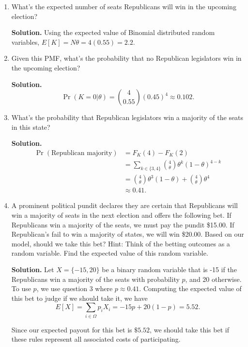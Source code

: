 \documentclass[12pt]{article}
\begin{document}
\begin{enumerate}
    \item What’s the expected number of seats Republicans will win in the upcoming election?

    \textbf{Solution.} Using the expected value of Binomial distributed random variables, $E[K]=N\theta = 4(0.55)=2.2$.

    \item Given this PMF, what’s the probability that no Republican legislators win in the upcoming election?

    \textbf{Solution.}
    \[ \Pr(K=0 | \theta) = \binom{4}{0.55}    (0.45)^{4} \approx 0.102. \]
    
    \item What’s the probability that Republican legislators win a majority of the seats in this state?

    \textbf{Solution.} 
    \begin{align*}
         \Pr(\text{Republican majority}) &= F_K(4)-F_K(2) 
         \\ &= \sum_{k\in\{3,4\}}\binom{4}{\theta}\theta^k    (1-\theta)^{4-k} 
         \\ &= \binom{4}{\theta}\theta^3    (1-\theta) + \binom{4}{\theta}\theta^4 
         \\ &\approx 0.41.
    \end{align*}

    \item  A prominent political pundit declares they are certain that Republicans will win a majority of seats in the next election and offers the following bet. If Republicans win a majority of the seats, we must pay the pundit \$15.00. If Republican’s fail to win a majority of states, we will win \$20.00. Based on our model, should we take this bet? Hint: Think of the betting outcomes as a random variable. Find the expected value of this random variable.

    \textbf{Solution.} Let $X=\{-15,20\}$ be a binary random variable that is -15 if the Republicans win a majority of the seats with probability $p$, and 20 otherwise. 
    To use $p$, we use question 3 where $p\approx 0.41$.
    Computing the expected value of this bet to judge if we should take it, we have 
    \[ E[X] = \sum_{i \in \Omega} p_iX_i = -15p + 20(1-p) =5.52. \]

    Since our expected payout for this bet is $\$5.52$, we should take this bet if these rules represent all associated costs of participating. 


\end{enumerate}
\end{document}
